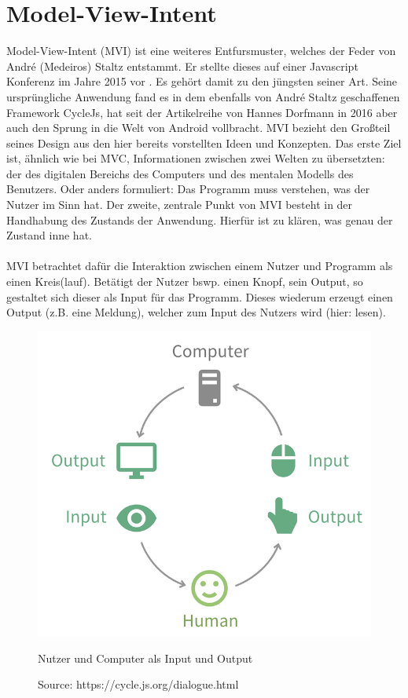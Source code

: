 \section{Model-View-Intent}
\label{sec:model-view-intent}
Model-View-Intent (MVI) ist eine weiteres Entfursmuster, welches der Feder von André (Medeiros) Staltz entstammt. Er stellte dieses auf einer Javascript Konferenz im Jahre 2015 vor
\cite{modelViewIntentIntroduction}. Es gehört damit zu den jüngsten seiner Art.
Seine ursprüngliche Anwendung fand es in dem ebenfalls von André Staltz geschaffenen Framework CycleJs, hat seit der Artikelreihe von Hannes Dorfmann in 2016
\cite{modelViewIntentOnAndroidHannesDorfmann2016}
aber auch den Sprung in die Welt von Android vollbracht. MVI bezieht den Großteil seines Design aus den hier bereits vorstellten Ideen und Konzepten. Das erste Ziel ist, ähnlich wie bei MVC, Informationen zwischen zwei Welten zu übersetzten: der des digitalen Bereichs des Computers und des mentalen Modells des Benutzers. Oder anders formuliert: Das Programm muss verstehen, was der Nutzer im Sinn hat.
Der zweite, zentrale Punkt von MVI besteht in der Handhabung des Zustands der Anwendung. Hierfür ist zu klären, was genau der Zustand inne hat.
\\
\\
MVI betrachtet dafür die Interaktion zwischen einem Nutzer und Programm als einen Kreis(lauf). Betätigt der Nutzer bswp. einen Knopf, sein Output, so gestaltet sich dieser als Input für das Programm. Dieses wiederum erzeugt einen Output (z.B. eine Meldung), welcher zum Input des Nutzers wird (hier: lesen).
\begin{figure}[ht]
	\centering
	\includegraphics[height=0.5\textwidth]{./images/mvi-cycle}
	\caption{Nutzer und Computer als Input und Output}
	\caption*{Source: https://cycle.js.org/dialogue.html}
	\label{fig:userComputerInputOutput}
\end{figure}
